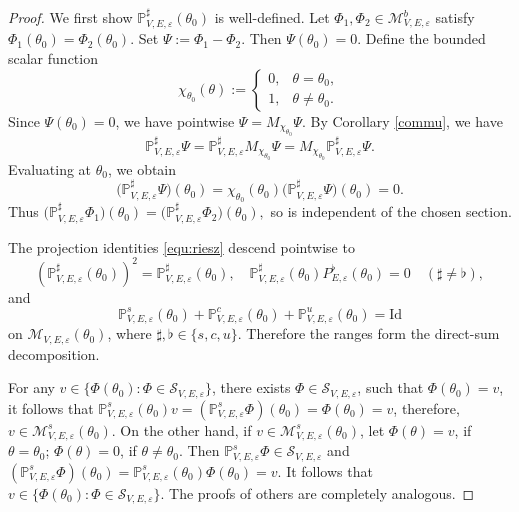 \documentclass[reqno,11pt]{amsart}
\begin{document}
\begin{proof}
We first show $\mathbb{P}^\sharp_{V,E,\varepsilon}(\theta_0)$ is well-defined.
Let $\Phi_1,\Phi_2\in\mathcal{M}_{V,E,\varepsilon}^b$
satisfy
$
\Phi_1(\theta_0)=\Phi_2(\theta_0).
$
Set $\Psi:=\Phi_1-\Phi_2$. Then $\Psi(\theta_0)=0$.
Define the bounded scalar function
$$
\chi_{\theta_0}(\theta):=
\begin{cases}
0,&\theta=\theta_0,\\
1,&\theta\neq \theta_0.
\end{cases}
$$
Since $\Psi(\theta_0)=0$, we have pointwise
$
\Psi=M_{\chi_{\theta_0}}\Psi.
$
By Corollary \ref{commu}, we have$$
\mathbb{P}^\sharp_{V,E,\varepsilon}\Psi=
\mathbb{P}^\sharp_{V,E,\varepsilon}M_{\chi_{\theta_0}}\Psi=
M_{\chi_{\theta_0}}\mathbb{P}^\sharp_{V,E,\varepsilon}\Psi.
$$
Evaluating at $\theta_0$, we obtain
$$
\bigl(\mathbb{P}^\sharp_{V,E,\varepsilon}\Psi\bigr)(\theta_0)=
\chi_{\theta_0}(\theta_0) 
\bigl(\mathbb{P}^\sharp_{V,E,\varepsilon}\Psi\bigr)(\theta_0)=0.
$$
Thus
$
\bigl(\mathbb{P}^\sharp_{V,E,\varepsilon}\Phi_1\bigr)(\theta_0)=
\bigl(\mathbb{P}^\sharp_{V,E,\varepsilon}\Phi_2\bigr)(\theta_0),
$
so  is independent of the chosen section.

The projection identities \eqref{equ:riesz}
descend pointwise to
$$
(\mathbb{P}^\sharp_{V,E,\varepsilon}(\theta_0))^2=\mathbb{P}^\sharp_{V,E,\varepsilon}(\theta_0),
\quad
\mathbb{P}^\sharp_{V,E,\varepsilon}(\theta_0)P^\flat_{E,\varepsilon}(\theta_0)=0
\quad (\sharp\neq\flat),
$$
and
$$
\mathbb{P}^s_{V,E,\varepsilon}(\theta_0)+\mathbb{P}^c_{V,E,\varepsilon}(\theta_0)+\mathbb{P}^u_{V,E,\varepsilon}(\theta_0)=
\mathrm{Id}
$$
on $\mathcal{M}_{V,E,\varepsilon}(\theta_0)$, where $\sharp,\flat\in\{s,c,u\}.$
Therefore the ranges form the direct-sum
decomposition.

For any $v\in \{\Phi(\theta_0):\Phi\in\mathcal{S}_{V,E,\varepsilon}\}$, there exists $\Phi\in\mathcal{S}_{V,E,\varepsilon}$, such that $\Phi(\theta_0)=v$, it follows that 
$\mathbb{P}^s_{V,E,\varepsilon}(\theta_0)v=(\mathbb{P}^s_{V,E,\varepsilon}\Phi)(\theta_0)=\Phi(\theta_0)=v$, therefore, $v\in \mathcal{M}_{V,E,\varepsilon}^s(\theta_0)$. On the other hand, if $v\in\mathcal{M}_{V,E,\varepsilon}^s(\theta_0) $, let $\Phi(\theta)=v$,  if $\theta=\theta_0$; $\Phi(\theta)=0$, if $\theta\neq\theta_0$. Then  $\mathbb{P}^s_{V,E,\varepsilon}\Phi\in \mathcal{S}_{V,E,\varepsilon}$ and $(\mathbb{P}^s_{V,E,\varepsilon}\Phi)(\theta_0)=\mathbb{P}^s_{V,E,\varepsilon}(\theta_0)\Phi(\theta_0)=v.$   It follows that $v\in \{\Phi(\theta_0):\Phi\in\mathcal{S}_{V,E,\varepsilon}\}.$ The proofs of others
are completely analogous. 
\end{proof}
\end{document}
